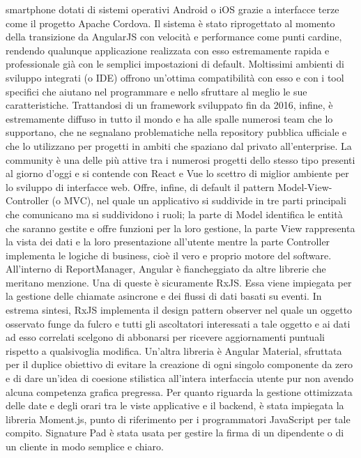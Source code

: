 smartphone dotati di sistemi operativi Android o iOS grazie a interfacce terze come il progetto Apache Cordova.
Il sistema è stato riprogettato al momento della transizione da AngularJS con velocità e performance come punti cardine, rendendo qualunque applicazione realizzata con esso estremamente
rapida e professionale già con le semplici impostazioni di default.
Moltissimi ambienti di sviluppo integrati (o IDE) offrono un'ottima compatibilità con esso e con i tool specifici che aiutano nel programmare e nello sfruttare al meglio le sue 
caratteristiche.
Trattandosi di un framework sviluppato fin da 2016, infine, è estremamente diffuso in tutto il mondo e ha alle spalle numerosi team che lo supportano,
che ne segnalano problematiche nella repository pubblica ufficiale e che lo utilizzano per progetti in ambiti che spaziano dal privato all'enterprise.
La community è una delle più attive tra i numerosi progetti dello stesso tipo presenti al giorno d'oggi e si contende con React e Vue lo scettro di miglior ambiente per lo 
sviluppo di interfacce web.
Offre, infine, di default il pattern Model-View-Controller (o MVC), nel quale un applicativo si suddivide in tre parti principali che comunicano ma si suddividono i ruoli;
la parte di Model identifica le entità che saranno gestite e offre funzioni per la loro gestione, la parte View rappresenta la vista dei dati e la loro presentazione all'utente mentre
la parte Controller implementa le logiche di business, cioè il vero e proprio motore del software.
\\
All'interno di ReportManager, Angular è fiancheggiato da altre librerie che meritano menzione.
Una di queste è sicuramente RxJS. Essa viene impiegata per la gestione delle chiamate asincrone e dei flussi di dati basati su eventi.
In estrema sintesi, RxJS implementa il design pattern observer nel quale un oggetto osservato funge da fulcro e tutti gli ascoltatori interessati a tale oggetto e ai dati ad esso
correlati scelgono di abbonarsi per ricevere aggiornamenti puntuali rispetto a qualsivoglia modifica.
Un'altra libreria è Angular Material, sfruttata per il duplice obiettivo di evitare la creazione di ogni singolo componente da zero e di dare un'idea di coesione stilistica
all'intera interfaccia utente pur non avendo alcuna competenza grafica pregressa.
Per quanto riguarda la gestione ottimizzata delle date e degli orari tra le viste applicative e il backend, è stata impiegata la libreria Moment.js, punto di riferimento per i 
programmatori JavaScript per tale compito.
Signature Pad è stata usata per gestire la firma di un dipendente o di un cliente in modo semplice e chiaro.
